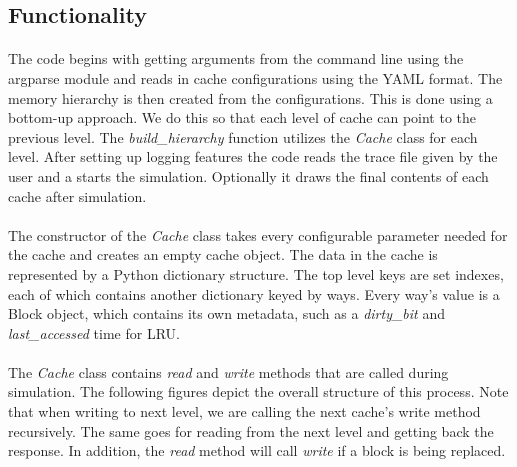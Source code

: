 \documentclass[11pt]{article}
\begin{document}
\subsection{Functionality}
\paragraph{}
The code begins with getting arguments from the command line using the argparse module and reads in cache configurations using the YAML format. The memory hierarchy is then created from the configurations. This is done using a bottom-up approach. We do this so that each level of cache can point to the previous level. The \textit{build\_hierarchy} function utilizes the \textit{Cache} class for each level. After setting up logging features the code reads the trace file given by the user and a starts the simulation. Optionally it draws the final contents of each cache after simulation. 

\paragraph{}
The constructor of the \textit{Cache} class takes every configurable parameter needed for the cache and creates an empty cache object. The data in the cache is represented by a Python dictionary structure. The top level keys are set indexes, each of which contains another dictionary keyed by ways. Every way's value is a Block object, which contains its own metadata, such as a \textit{dirty\_bit} and \textit{last\_accessed} time for LRU. 

\paragraph{}
The \textit{Cache} class contains \textit{read} and \textit{write} methods that are called during simulation. The following figures depict the overall structure of this process. Note that when writing to next level, we are calling the next cache's write method recursively. The same goes for reading from the next level and getting back the response. In addition, the \textit{read} method will call \textit{write} if a block is being replaced. 
\end{document}
